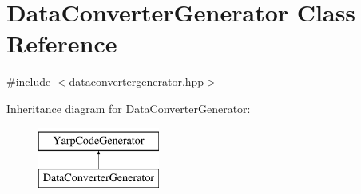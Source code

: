 \hypertarget{classDataConverterGenerator}{\section{Data\-Converter\-Generator Class Reference}
\label{classDataConverterGenerator}
}


{\ttfamily \#include $<$dataconvertergenerator.\-hpp$>$}

Inheritance diagram for Data\-Converter\-Generator\-:\begin{figure}[H]
\begin{center}
\leavevmode
\includegraphics[height=2.000000cm]{classDataConverterGenerator}
\end{center}
\end{figure}

